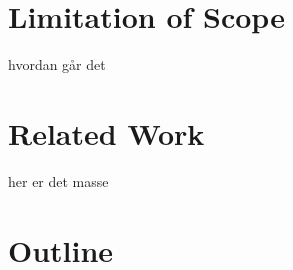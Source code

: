 \section{Limitation of Scope}
hvordan går det
\section{Related Work}
her er det masse
\section{Outline}